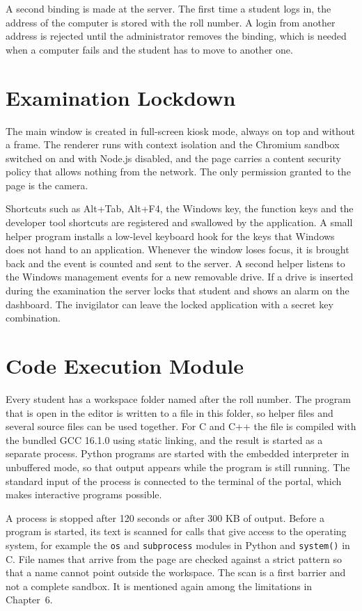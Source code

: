 \documentclass[12pt,a4paper]{report}
\begin{document}
A second binding is made at the server. The first time a student logs in, the address of the computer is stored with the roll number. A login from another address is rejected until the administrator removes the binding, which is needed when a computer fails and the student has to move to another one.

\section{Examination Lockdown}
The main window is created in full-screen kiosk mode, always on top and without a frame. The renderer runs with context isolation and the Chromium sandbox switched on and with Node.js disabled, and the page carries a content security policy that allows nothing from the network. The only permission granted to the page is the camera.

Shortcuts such as Alt+Tab, Alt+F4, the Windows key, the function keys and the developer tool shortcuts are registered and swallowed by the application. A small helper program installs a low-level keyboard hook for the keys that Windows does not hand to an application. Whenever the window loses focus, it is brought back and the event is counted and sent to the server. A second helper listens to the Windows management events for a new removable drive. If a drive is inserted during the examination the server locks that student and shows an alarm on the dashboard. The invigilator can leave the locked application with a secret key combination.

\section{Code Execution Module}
Every student has a workspace folder named after the roll number. The program that is open in the editor is written to a file in this folder, so helper files and several source files can be used together. For C and C++ the file is compiled with the bundled GCC 16.1.0 using static linking, and the result is started as a separate process. Python programs are started with the embedded interpreter in unbuffered mode, so that output appears while the program is still running. The standard input of the process is connected to the terminal of the portal, which makes interactive programs possible.

A process is stopped after 120 seconds or after 300 KB of output. Before a program is started, its text is scanned for calls that give access to the operating system, for example the \texttt{os} and \texttt{subprocess} modules in Python and \texttt{system()} in C. File names that arrive from the page are checked against a strict pattern so that a name cannot point outside the workspace. The scan is a first barrier and not a complete sandbox. It is mentioned again among the limitations in Chapter~6.
\end{document}
